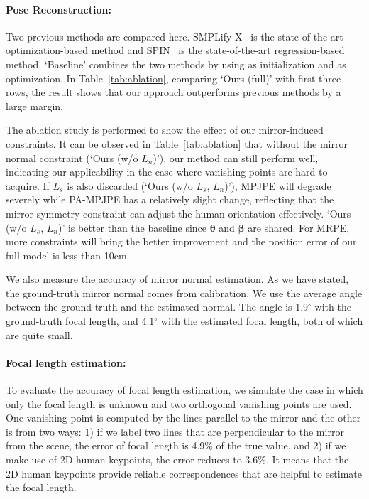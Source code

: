 \paragraph{Pose Reconstruction:} 
Two previous methods are compared here. SMPLify-X~\cite{SMPL-X:2019} is the state-of-the-art optimization-based method and SPIN~\cite{kolotouros2019spin} is the state-of-the-art regression-based method. `Baseline' combines the two methods by using \cite{kolotouros2019spin} as initialization and \cite{SMPL-X:2019} as optimization. In Table~\ref{tab:ablation}, comparing `Ours (full)' with first three rows, the result shows that our approach outperforms previous methods by a large margin. 

The ablation study is performed to show the effect of our mirror-induced constraints. It can be observed in Table~\ref{tab:ablation} that without the mirror normal constraint (`Ours (w/o $L_{n}$)'), our method can still perform well, indicating our applicability in the case where vanishing points are hard to acquire. If $L_{s}$ is also discarded (`Ours (w/o $L_{s}$, $L_{n}$)'), MPJPE will degrade severely while PA-MPJPE has a relatively slight change, reflecting that the mirror symmetry constraint can adjust the human orientation effectively. `Ours (w/o $L_{s}$, $L_{n}$)' is better than the baseline since $\bm \theta$ and $\bm \beta$ are shared. For MRPE, more constraints will bring the better improvement and the position error of our full model is less than 10cm. 

We also measure the accuracy of mirror normal estimation. As we have stated, the ground-truth mirror normal comes from calibration. We use the average angle between the ground-truth and the estimated normal. The angle is 1.9$^\circ$ with the ground-truth focal length, and 4.1$^\circ$ with the estimated focal length, both of which are quite small.

\paragraph{Focal length estimation:} To evaluate the accuracy of focal length estimation, we simulate the case in which only the focal length is unknown and two orthogonal vanishing points are used. One vanishing point is computed by the lines parallel to the mirror and the other is from two ways: 1) if we label two lines that are perpendicular to the mirror from the scene, the error of focal length is 4.9\% of the true value, and 2) if we make use of 2D human keypoints, the error reduces to 3.6\%. It means that the 2D human keypoints provide reliable correspondences that are helpful to estimate the focal length.

